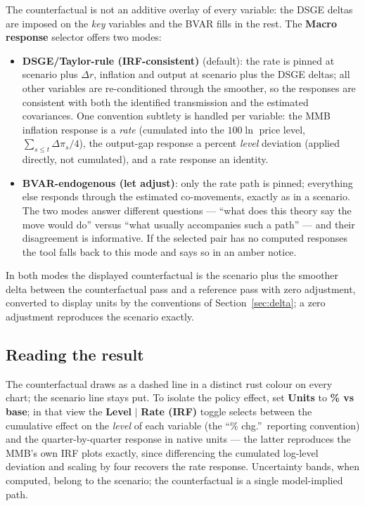 \documentclass[11pt]{article}
\newcommand{\ui}[1]{\textbf{#1}}
\theoremstyle{plain}
\theoremstyle{remark}
\begin{document}
The counterfactual is not an additive overlay of every variable: the
DSGE deltas are imposed on the \emph{key} variables and the BVAR fills
in the rest. The \ui{Macro response} selector offers two modes:
\begin{itemize}
  \item \ui{DSGE/Taylor-rule (IRF-consistent)} (default): the rate is
    pinned at scenario plus $\Delta r$, inflation and output at scenario
    plus the DSGE deltas; all other variables are re-conditioned through
    the smoother, so the responses are consistent with both the
    identified transmission and the estimated covariances. One
    convention subtlety is handled per variable: the MMB inflation
    response is a \emph{rate} (cumulated into the $100\ln$ price level,
    $\sum_{s\le t}\Delta\pi_s/4$), the output-gap response a percent
    \emph{level} deviation (applied directly, not cumulated), and a rate
    response an identity.
  \item \ui{BVAR-endogenous (let adjust)}: only the rate path is pinned;
    everything else responds through the estimated co-movements, exactly
    as in a scenario. The two modes answer different questions ---
    ``what does this theory say the move would do'' versus ``what
    usually accompanies such a path'' --- and their disagreement is
    informative. If the selected pair has no computed responses the tool
    falls back to this mode and says so in an amber notice.
\end{itemize}
In both modes the displayed counterfactual is the scenario plus the
smoother delta between the counterfactual pass and a reference pass with
zero adjustment, converted to display units by the conventions of
Section~\ref{sec:delta}; a zero adjustment reproduces the scenario
exactly.

\subsection{Reading the result}\label{sec:cfread}

The counterfactual draws as a dashed line in a distinct rust colour on
every chart; the scenario line stays put. To isolate the policy effect,
set \ui{Units} to \ui{\% vs base}; in that view the \ui{Level} $\mid$
\ui{Rate (IRF)} toggle selects between the cumulative effect on the
\emph{level} of each variable (the ``\% chg.''\ reporting convention)
and the quarter-by-quarter response in native units --- the latter
reproduces the MMB's own IRF plots exactly, since differencing the
cumulated log-level deviation and scaling by four recovers the rate
response. Uncertainty bands, when computed, belong to the scenario; the
counterfactual is a single model-implied path.
\end{document}
